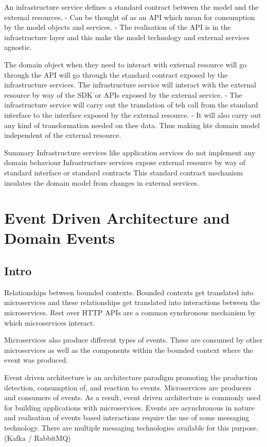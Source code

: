 An infrastructure service defines a standard contract between the model and the external resources.
- Can be thought of as an API which mean for consumption by the model objects and services.
- The realisation of the API is in the infrastructure layer and this make the model technology and external services agnostic.

The domain object when they need to interact with external resource will go through the API will go through the standard contract exposed by the infrastructure services.
The infrastructure service will interact with the external resource by way of the SDK or APIs exposed by the external service.
- The infrastructure service will carry out the translation of teh call from the standard interface to the interface exposed by the external resource.
- It will also carry out any kind of transformation needed on thee data.
Thus making hte domain model independent of the external resource.

Summary
Infrastructure services like application services do not implement any domain behaviour
Infrastructure services expose external resource by way of standard interface or standard contracts
This standard contract mechanism insulates the domain model from changes in external services.

\chapter{Event Driven Architecture and Domain Events}

\section{Intro}
Relationships between bounded contexts.
Bounded contexts get translated into microservices and these relationships get translated into interactions between the microservices.
Rest over HTTP APIs are a common synchronous mechanism by which microservices interact.

Microservices also produce different types of events.
These are consumed by other microservices as well as the components within the bounded context where the event was produced.

Event driven architecture is an architecture paradigm promoting the production detection, consumption of, and reaction to events.
Microservices are producers and consumers of events.
As a result, event driven architecture is commonly used for building applications with microservices.
Events are asynchronous in nature and realisation of events based interactions require the use of some messaging technology.
There are multiple messaging technologies available for this purpose. (Kafka / RabbitMQ) %

